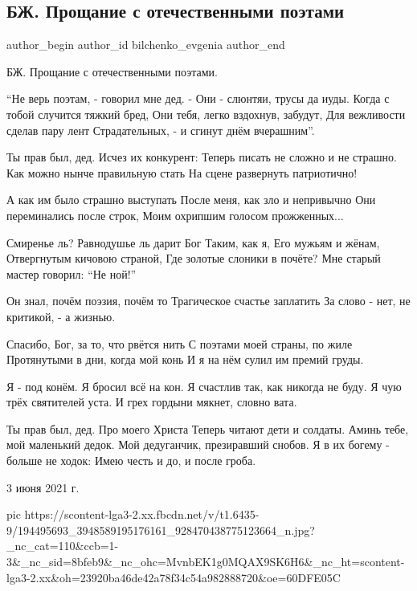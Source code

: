  
 
 
 
 
 
\subsection{БЖ. Прощание с отечественными поэтами}
\label{sec:03_06_2021.fb.bilchenko_evgenia.1.proschanie_s_otechestvennymi_poetami}
\ifcmt
 author_begin
   author_id bilchenko_evgenia
 author_end
\fi

БЖ. Прощание с отечественными поэтами.

\enquote{Не верь поэтам, - говорил мне дед. - 
Они - слюнтяи, трусы да иуды.
Когда с тобой случится тяжкий бред,
Они тебя, легко вздохнув, забудут,
Для вежливости сделав пару лент
Страдательных, - и сгинут днём вчерашним}.

Ты прав был, дед. Исчез их конкурент:
Теперь писать не сложно и не страшно.
Как можно нынче правильную стать
На сцене развернуть патриотично!

А как им было страшно выступать
После меня, как зло и непривычно
Они переминались после строк,
Моим охрипшим голосом прожженных...

Смиренье ль? Равнодушье ль дарит Бог
Таким, как я, Его мужьям и жёнам,
Отвергнутым кичовою страной,
Где золотые слоники в почёте?
Мне старый мастер говорил: \enquote{Не ной!}

Он знал, почём поэзия, почём то
Трагическое счастье заплатить
За слово - нет, не критикой, - а жизнью.

Спасибо, Бог, за то, что рвётся нить
С поэтами моей страны, по жиле
Протянутыми в дни, когда мой конь
И я на нём сулил им премий груды.

Я - под конём. Я бросил всё на кон.
Я счастлив так, как никогда не буду.
Я чую трёх святителей уста.
И грех гордыни мякнет, словно вата.

Ты прав был, дед. Про моего Христа
Теперь читают дети и солдаты.
Аминь тебе, мой маленький дедок.
Мой дедуганчик, презиравший снобов.
Я в их богему - больше не ходок:
Имею честь и до, и после гроба.

3 июня 2021 г.

\ifcmt
  pic https://scontent-lga3-2.xx.fbcdn.net/v/t1.6435-9/194495693_3948589195176161_928470438775123664_n.jpg?_nc_cat=110&ccb=1-3&_nc_sid=8bfeb9&_nc_ohc=MvnbEK1g0MQAX9SK6H6&_nc_ht=scontent-lga3-2.xx&oh=23920ba46de42a78f34c54a982888720&oe=60DFE05C
\fi
